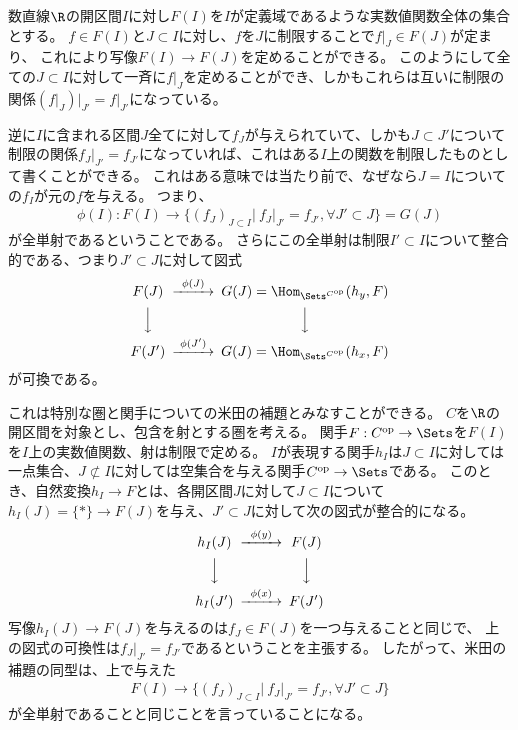 \documentclass[uplatex]{jsarticle}
\begin{document}
\begin{eg}
数直線$\R$の開区間$I$に対し$F(I)$を$I$が定義域であるような実数値関数全体の集合とする。
$f \in F(I)$と$J\subset I$に対し、$f$を$J$に制限することで$f\vert_J \in F(J)$が定まり、
これにより写像$F(I) \to F(J)$を定めることができる。
このようにして全ての$J \subset I$に対して一斉に$f\vert_J$を定めることができ、しかもこれらは互いに制限の関係$(f\vert_J)\vert_{J'}=f\vert_{J'}$になっている。

逆に$I$に含まれる区間$J$全てに対して$f_J$が与えられていて、しかも$J\subset J'$について制限の関係$f_J\vert_{J'}=f_{J'}$になっていれば、これはある$I$上の関数を制限したものとして書くことができる。
これはある意味では当たり前で、なぜなら$J=I$についての$f_I$が元の$f$を与える。
つまり、
\begin{align*}
\phi(I):F(I) \to \{(f_J)_{J\subset I}\vert~ f_J\vert_{J'} = f_{J'}, \forall J' \subset J\}=G(J)
\end{align*}
が全単射であるということである。
さらにこの全単射は制限$I'\subset I$について整合的である、つまり$J'\subset J$に対して図式
\[
\begin{CD}
F(J)@>\phi(J)>>G(J)=\Hom_{\Sets^{C^{\rm op}}}(h_y,F)\\
@VVV@VVV\\
F(J')@>\phi(J')>>G(J)=\Hom_{\Sets^{C^{\rm op}}}(h_x,F)
\end{CD}
\]
が可換である。

これは特別な圏と関手についての米田の補題とみなすことができる。
$C$を$\R$の開区間を対象とし、包含を射とする圏を考える。
関手$F:C^{\rm op} \to \Sets$を$F(I)$を$I$上の実数値関数、射は制限で定める。
$I$が表現する関手$h_I$は$J \subset I$に対しては一点集合、$J \not\subset I$に対しては空集合を与える関手$C^{\rm op} \to \Sets$である。
このとき、自然変換$h_I \to F$とは、各開区間$J$に対して$J \subset I$について$h_I(J)=\{*\} \to F(J)$を与え、$J'\subset J$に対して次の図式が整合的になる。
\[
\begin{CD}
h_I(J)@>\phi(y)>>F(J)\\
@VVV@VVV\\
h_I(J')@>\phi(x)>>F(J')
\end{CD}
\]
写像$h_I(J) \to F(J)$を与えるのは$f_J\in F(J)$を一つ与えることと同じで、
上の図式の可換性は$f_J\vert_{J'}=f_{J'}$であるということを主張する。
したがって、米田の補題の同型は、上で与えた
\begin{align*}
F(I) \to \{(f_J)_{J\subset I}\vert~ f_J\vert_{J'} = f_{J'}, \forall J' \subset J\}
\end{align*}
が全単射であることと同じことを言っていることになる。
\end{eg}
\end{document}
